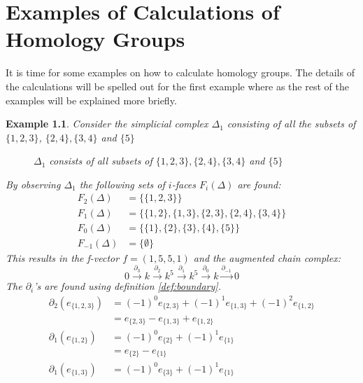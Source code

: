 \documentclass[11pt,a4paper,twoside]{report}
\newtheorem{myex}[mythm]{Example}
\begin{document}
\chapter{Examples of Calculations of Homology Groups}
It is time for some examples on how to calculate homology groups. The details of the calculations will be spelled out for the first example where as the rest of the examples will be explained more briefly.
\begin{myex}
Consider the simplicial complex $\Delta_1$ consisting of all the subsets of $\{1,2,3\}$, $\{2,4\},\{3,4\}$ and $\{5\}$
\begin{figure}[H]
\center
{}
\caption{$\Delta_1$ consists of all subsets of $\{1,2,3\},\{2,4\},\{3,4\}$ and $\{5\}$}
\label{fig:ex1}
\end{figure}
By observing $\Delta_1$ the following sets of $i$-faces $F_i(\Delta)$ are found:
\begin{align*}
F_2(\Delta) &= \{\{1,2,3\}\}\\
F_1(\Delta) &= \{\{1,2\},\{1,3\},\{2,3\},\{2,4\},\{3,4\}\}\\
F_0(\Delta) &= \{\{1\},\{2\},\{3\},\{4\},\{5\}\}\\
F_{-1}(\Delta) &= \{\emptyset\}
\end{align*}
This results in the f-vector $f=(1,5,5,1)$ and the augmented chain complex:
\begin{equation*}
0\overset{\partial_3}{\longrightarrow} k\overset{\partial_2}{\longrightarrow} k^5\overset{\partial_1}{\longrightarrow} k^5\overset{\partial_0}{\longrightarrow} k \overset{\partial_{-1}}{\to} 0
\end{equation*}
The $\partial_i$'s are found using definition \ref{def:boundary}. 
\begin{align*}
\partial_2(e_{\{1,2,3\}})&=(-1)^0e_{\{2,3\}}+(-1)^1e_{\{1,3\}}+(-1)^2e_{\{1,2\}}\\
&=e_{\{2,3\}}-e_{\{1,3\}}+e_{\{1,2\}}\\
\partial_1(e_{\{1,2\}})&=(-1)^0e_{\{2\}}+(-1)^1e_{\{1\}}\\
&=e_{\{2\}}-e_{\{1\}}\\
\partial_1(e_{\{1,3\}})&=(-1)^0e_{\{3\}}+(-1)^1e_{\{1\}}\\

\end{align*}
\end{myex}
\end{document}
